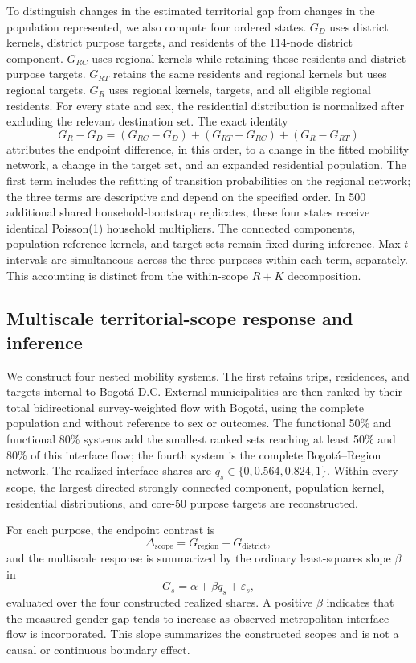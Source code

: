\documentclass[11pt]{article}
\begin{document}
To distinguish changes in the estimated territorial gap from changes in the population represented, we also compute four ordered states. $G_D$ uses district kernels, district purpose targets, and residents of the 114-node district component. $G_{RC}$ uses regional kernels while retaining those residents and district purpose targets. $G_{RT}$ retains the same residents and regional kernels but uses regional targets. $G_R$ uses regional kernels, targets, and all eligible regional residents. For every state and sex, the residential distribution is normalized after excluding the relevant destination set. The exact identity
\begin{equation}
G_R-G_D=(G_{RC}-G_D)+(G_{RT}-G_{RC})+(G_R-G_{RT})
\label{eq:territorial-accounting}
\end{equation}
attributes the endpoint difference, in this order, to a change in the fitted mobility network, a change in the target set, and an expanded residential population. The first term includes the refitting of transition probabilities on the regional network; the three terms are descriptive and depend on the specified order. In 500 additional shared household-bootstrap replicates, these four states receive identical Poisson(1) household multipliers. The connected components, population reference kernels, and target sets remain fixed during inference. Max-$t$ intervals are simultaneous across the three purposes within each term, separately. This accounting is distinct from the within-scope $R+K$ decomposition.

\subsection{Multiscale territorial-scope response and inference}
We construct four nested mobility systems. The first retains trips, residences, and targets internal to Bogotá D.C. External municipalities are then ranked by their total bidirectional survey-weighted flow with Bogotá, using the complete population and without reference to sex or outcomes. The functional 50\% and functional 80\% systems add the smallest ranked sets reaching at least 50\% and 80\% of this interface flow; the fourth system is the complete Bogotá--Region network. The realized interface shares are $q_s\in\{0,0.564,0.824,1\}$. Within every scope, the largest directed strongly connected component, population kernel, residential distributions, and core-50 purpose targets are reconstructed.

For each purpose, the endpoint contrast is
\begin{equation}
 \Delta_{\mathrm{scope}}=G_{\mathrm{region}}-G_{\mathrm{district}},
\end{equation}
and the multiscale response is summarized by the ordinary least-squares slope $\beta$ in
\begin{equation}
 G_s=\alpha+\beta q_s+\varepsilon_s,
\end{equation}
evaluated over the four constructed realized shares. A positive $\beta$ indicates that the measured gender gap tends to increase as observed metropolitan interface flow is incorporated. This slope summarizes the constructed scopes and is not a causal or continuous boundary effect.
\end{document}
